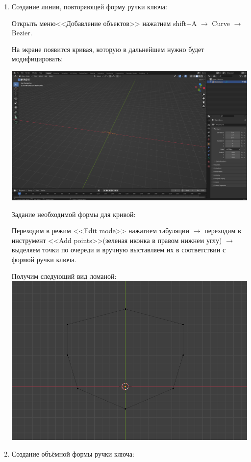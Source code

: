 \documentclass[12pt]{article}
\begin{document}
\begin{enumerate}

\item Создание линии, повторяющей форму ручки ключа:


Открыть меню<<Добавление объектов>> нажатием shift+A   $\to $  Curve  $\to $ Bezier.

На экране появится кривая, которую в дальнейшем нужно будет модифицировать:


\vskip 1cm
{
    \centering
    \includegraphics[width=1\linewidth]{кривая1.png}
    \label{fig:i1}
}
\vskip 1cm


Задание необходимой формы для кривой:

Переходим в режим <<Edit mode>> нажатием табуляции  $\to $   переходим в инструмент <<Add points>>(зеленая иконка в правом нижнем углу)  $\to $ выделяем точки по очереди и вручную выставляем их в соответствии с формой ручки ключа.

Получим следующий вид ломаной:
\vskip 1cm
{
    \centering
    \includegraphics[width=0.7\linewidth]{3кривая1.png}
    \label{fig:i1}
}
\vskip 1cm

\item Создание объёмной формы ручки ключа:


\end{enumerate}
\end{document}
